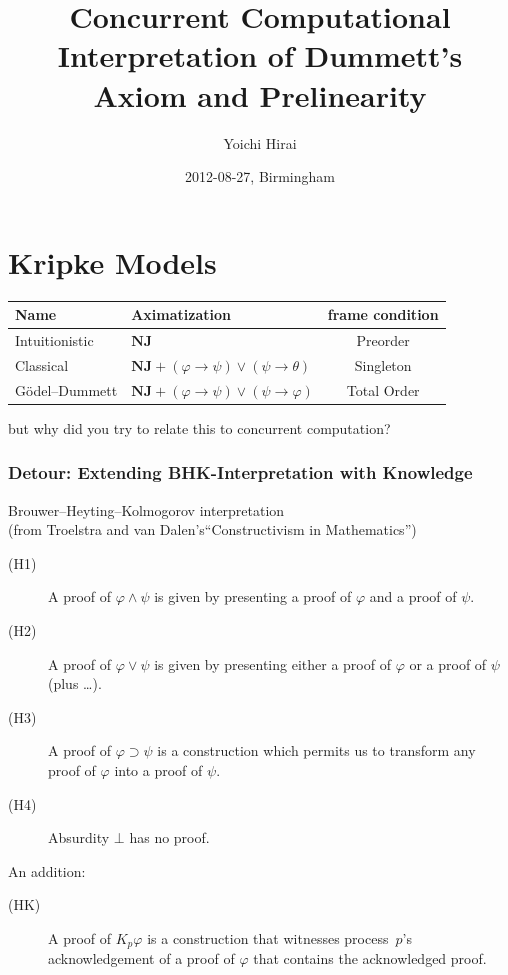 \documentclass[slidestop,compress,mathserif]{beamer}
\title{Concurrent Computational Interpretation of Dummett's Axiom and Prelinearity}
\author{Yoichi Hirai}
\institute{Univ. of Tokyo, JSPS research fellow}
\date{2012-08-27, Birmingham}
\renewcommand{\phi}{\varphi}
\begin{document}
 \begin{frame} %
  \titlepage
 \end{frame}

 \begin{frame}
  \tableofcontents[section]
 \end{frame}

 \section{Kripke Models}

\newcommand{\NJ}{\mathbf{NJ}}

  \begin{frame}
   \begin{tabular}{|l|l|c|}
    \hline
    Name & Aximatization & frame condition\\ \hline\hline
    Intuitionistic & $\NJ$ & Preorder \\ \hline
    Classical & $\NJ + (\phi\rightarrow \psi)\lor(\psi\rightarrow \theta) $
    & Singleton \\ \hline
    \alert{G\"odel--Dummett} & $\NJ + (\phi\rightarrow \psi)\lor(\psi\rightarrow \phi)$ &
	    Total Order
	    \\ \hline
   \end{tabular}
   \vfill
   \pause
   but why did you try to relate this to concurrent computation?
   \vfill
  \end{frame}

  \begin{frame}
   \frametitle{Detour: Extending BHK-Interpretation with Knowledge}

   Brouwer--Heyting--Kolmogorov interpretation\\
   (from Troelstra and van
   Dalen's``Constructivism in Mathematics'')
\begin{description}
 \item[(H1)] A proof of $\varphi\wedge \psi$ is given by presenting a proof of $\varphi$
	    and a proof of $\psi$.
 \item[(H2)] A proof of $\varphi\vee\psi$ is given by presenting either a proof of
	    $\varphi$ or a proof of $\psi$ (plus \ldots).
 \item[(H3)] A proof of $\varphi\supset\psi$ is a construction which permits us to
	    transform any proof of $\varphi$ into a proof of $\psi$.
 \item[(H4)] Absurdity $\bot$ has no proof.
\end{description}
   An addition:
   \begin{description}
 \item[(HK)] A proof of $K_p\varphi$ is a construction that witnesses process~$p$'s
	    acknowledgement of a proof of $\phi$ that contains the acknowledged
	    proof.
   \end{description}

  \end{frame}
\end{document}
